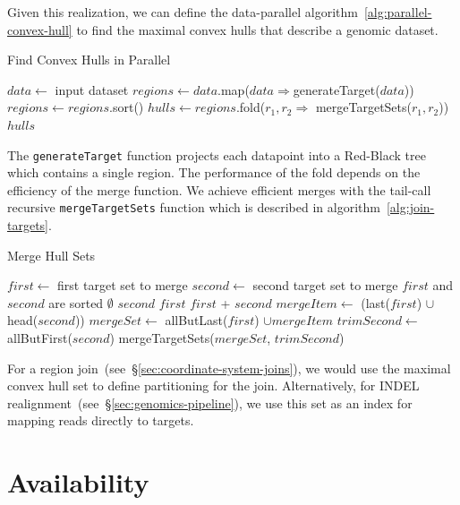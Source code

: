 \documentclass{acm_proc_article-sp}
\begin{document}
Given this realization, we can define the data-parallel algorithm~\ref{alg:parallel-convex-hull} to find the
maximal convex hulls that describe a genomic dataset.

\begin{algorithm}
\caption{Find Convex Hulls in Parallel}
\label{alg:parallel-convex-hull}
\begin{algorithmic}
\STATE $data \leftarrow$ input dataset
\STATE $regions \leftarrow data$.map($data \Rightarrow $generateTarget($data$))
\STATE $regions \leftarrow regions$.sort()
\STATE $hulls \leftarrow regions$.fold($r_1, r_2 \Rightarrow$ mergeTargetSets($r_1, r_2$))
\RETURN $hulls$
\end{algorithmic}
\end{algorithm}

The \texttt{generateTarget} function projects each datapoint into a Red-Black tree which contains a
single region. The performance of the fold depends on the efficiency of the merge function. We achieve
efficient merges with the tail-call recursive \texttt{mergeTargetSets} function which is described in
algorithm~\ref{alg:join-targets}.

\begin{algorithm}
\caption{Merge Hull Sets}
\label{alg:join-targets}
\begin{algorithmic}
\STATE $first \leftarrow$ first target set to merge
\STATE $second \leftarrow$ second target set to merge
\REQUIRE $first$ and $second$ are sorted
\RETURN $\emptyset$
\RETURN $second$
\RETURN $first$
\ELSE
{}
\RETURN $first$ + $second$
\ELSE
\STATE $mergeItem \leftarrow$ (last($first$) $\cup$ head($second$))
\STATE $mergeSet \leftarrow$ allButLast($first$) $\cup mergeItem$
\STATE $trimSecond \leftarrow$ allButFirst($second$)
\RETURN mergeTargetSets($mergeSet$, $trimSecond$)
\ENDIF
\ENDIF
\end{algorithmic}
\end{algorithm}

For a region join~(see~\S\ref{sec:coordinate-system-joins}), we would use the maximal convex hull
set to define partitioning for the join. Alternatively, for INDEL realignment~(see~\S\ref{sec:genomics-pipeline}),
we use this set as an index for mapping reads directly to targets.

\section{Availability}
\label{sec:availability}
\end{document}
